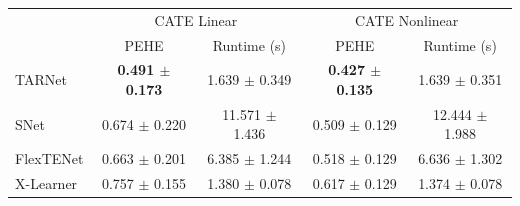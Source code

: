 \begin{tabular}{lcccc}
\toprule
 & \multicolumn{2}{c}{CATE Linear} & \multicolumn{2}{c}{CATE Nonlinear} \\
 & PEHE & Runtime (s) & PEHE & Runtime (s) \\
\midrule
TARNet & \textbf{0.491 $\pm$ 0.173} & 1.639 $\pm$ 0.349 & \textbf{0.427 $\pm$ 0.135} & 1.639 $\pm$ 0.351 \\
SNet & 0.674 $\pm$ 0.220 & 11.571 $\pm$ 1.436 & 0.509 $\pm$ 0.129 & 12.444 $\pm$ 1.988 \\
FlexTENet & 0.663 $\pm$ 0.201 & 6.385 $\pm$ 1.244 & 0.518 $\pm$ 0.129 & 6.636 $\pm$ 1.302 \\
X-Learner & 0.757 $\pm$ 0.155 & 1.380 $\pm$ 0.078 & 0.617 $\pm$ 0.129 & 1.374 $\pm$ 0.078 \\
\bottomrule
\end{tabular}
